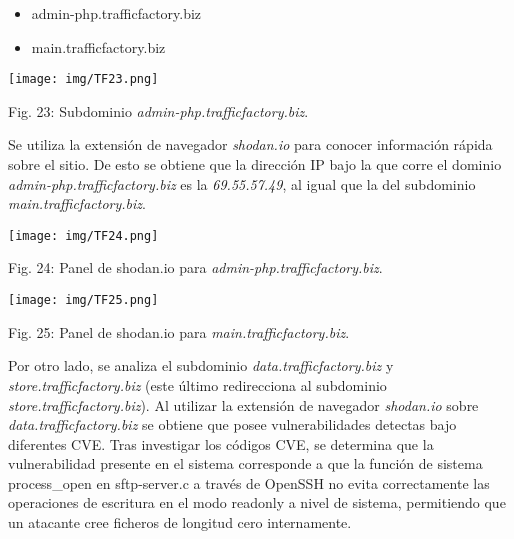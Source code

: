\documentclass[12pt,oneside,a4paper]{book}
\begin{document}
\vspace{1em}

\begin{itemize}
	\item admin-php.trafficfactory.biz
	\item main.trafficfactory.biz

\end{itemize}

\vspace{2em}

\begin{center}
	\texttt{[image: img/TF23.png]}
    
\vspace{0.1em}
    
    Fig. 23: Subdominio \textit{admin-php.trafficfactory.biz}.
\end{center}

\vspace{2em}

\hspace{20pt}
Se utiliza la extensión de navegador \textit{shodan.io} para conocer información rápida sobre el sitio. De esto se obtiene que la dirección IP bajo la que corre el dominio \textit{admin-php.trafficfactory.biz} es la \textit{69.55.57.49}, al igual que la del subdominio \textit{main.trafficfactory.biz}. 

\vspace{2em}

\begin{center}
	\texttt{[image: img/TF24.png]}
    
\vspace{0.1em}
    
    Fig. 24: Panel de shodan.io para \textit{admin-php.trafficfactory.biz}.
\end{center}

\vspace{2em}

\begin{center}
	\texttt{[image: img/TF25.png]}
    
\vspace{0.1em}
    
    Fig. 25: Panel de shodan.io para \textit{main.trafficfactory.biz}.
\end{center}

\vspace{2em}

\hspace{20pt}
Por otro lado, se analiza el subdominio  \textit{data.trafficfactory.biz} y \textit{store.trafficfactory.biz} (este último redirecciona al subdominio \textit{store.trafficfactory.biz}). Al utilizar la extensión de navegador \textit{shodan.io} sobre \textit{data.trafficfactory.biz} se obtiene que posee vulnerabilidades detectas bajo diferentes CVE. Tras investigar los códigos CVE, se determina que la vulnerabilidad presente en el sistema corresponde a que la función de sistema  process\_open en sftp-server.c a través de OpenSSH no evita correctamente las operaciones de escritura en el modo readonly a nivel de sistema, permitiendo que un atacante cree ficheros de longitud cero internamente.
\end{document}
